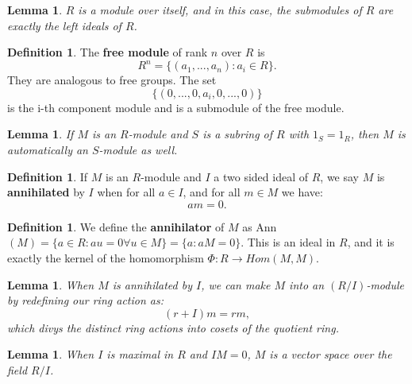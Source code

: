 \documentclass[9pt,reqno,twoside]{amsbook}
\theoremstyle{plain}
\numberwithin{section}{chapter}
\numberwithin{equation}{chapter}
\newtheorem{lem}[theorem]{Lemma}
\theoremstyle{definition}
\newtheorem{Def}[theorem]{Definition}
\theoremstyle{remark}
\theoremstyle{plain}
\begin{document}
\begin{lem}
$R$ is a module over itself, and in this case, the submodules of $R$ are exactly the left ideals of $R$. 
\end{lem}

\begin{Def}
The \textbf{free module} of rank $n$ over $R$ is 
$$
R^n = \{(a_1,...,a_n): a_i \in R\}.
$$
They are analogous to free groups. The set 
$$
\{(0,...,0,a_i,0,...,0)\}
$$
is the i-th component module and is a submodule of the free module. 
\end{Def}

\begin{lem}
If $M$ is an $R$-module and $S$ is a subring of $R$ with $1_S = 1_R$, then $M$ is automatically an $S$-module as well. 
\end{lem}

\begin{Def}
If $M$ is an $R$-module and $I$ a two sided ideal of $R$, we say $M$ is \textbf{annihilated} by $I$ when for all $a \in I$, and for all $m \in M$ we have:
$$
am = 0. 
$$
\end{Def}

\begin{Def}\label{annihilator1}
We define the \textbf{annihilator} of $M$ as Ann$(M) = \{a \in R: au = 0 \forall u \in M\} = \{a:aM = 0\}$. This is an ideal in $R$, and it is exactly the kernel of the homomorphism $\Phi:R \to Hom(M,M)$. 
\end{Def}

\begin{lem}
When $M$ is annihilated by $I$, we can make $M$ into an $(R/I)$-module by redefining our ring action as:
$$
(r + I)m = rm,
$$
which divys the distinct ring actions into cosets of the quotient ring. 
\end{lem}

\begin{lem}
When $I$ is maximal in $R$ and $IM = 0$, $M$ is a vector space over the field $R/I$. 
\end{lem}
\end{document}
